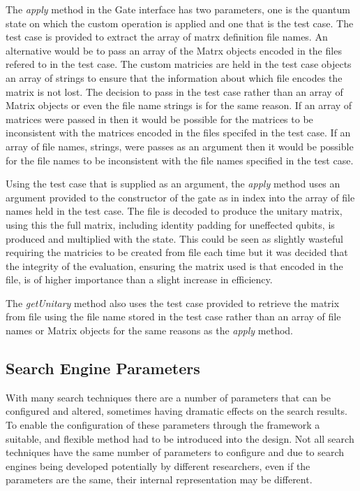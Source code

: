 The \emph{apply} method in the Gate interface has two parameters, one is the quantum state on which the custom operation is applied and one that is the test case.
The test case is provided to extract the array of matrx definition file names.
An alternative would be to pass an array of the Matrx objects encoded in the files refered to in the test case.
The custom matricies are held in the test case objects an array of strings to ensure that the information about which file encodes the matrix is not lost.
The decision to pass in the test case rather than an array of Matrix objects or even the file name strings is for the same reason.
If an array of matrices were passed in then it would be possible for the matrices to be inconsistent with the matrices encoded in the files specifed in the test case.
If an array of file names, strings, were passes as an argument then it would be possible for the file names to be inconsistent with the file names specified in the test case.

Using the test case that is supplied as an argument, the \emph{apply} method uses an argument provided to the constructor of the gate as in index into the array of file names held in the test case.
The file is decoded to produce the unitary matrix, using this the full matrix, including identity padding for uneffected qubits, is produced and multiplied with the state.
This could be seen as slightly wasteful requiring the matricies to be created from file each time but it was decided that the integrity of the evaluation, ensuring the matrix used is that encoded in the file, is of higher importance than a slight increase in efficiency.

The \emph{getUnitary} method also uses the test case provided to retrieve the matrix from file using the file name stored in the test case rather than an array of file names or Matrix objects for the same reasons as the \emph{apply} method.

\subsection{Search Engine Parameters}
With many search techniques there are a number of parameters that can be configured and altered, sometimes having dramatic effects on the search results.
To enable the configuration of these parameters through the framework a suitable, and flexible method had to be introduced into the design.
Not all search techniques have the same number of parameters to configure and due to search engines being developed potentially by different researchers, even if the parameters are the same, their internal representation may be different.

